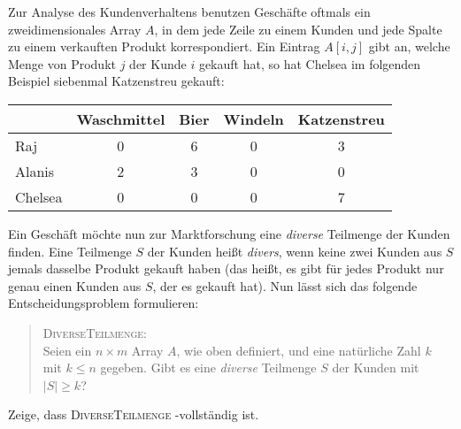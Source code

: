 \documentclass{uebung_cs}
\begin{document}
\begin{exercise}[Kundenanalyse][\hard]
	Zur Analyse des Kundenverhaltens benutzen Geschäfte oftmals ein zweidimensionales Array $A$, in dem jede Zeile zu einem Kunden und jede Spalte zu einem verkauften Produkt korrespondiert. Ein Eintrag $A[i,j]$ gibt an, welche Menge von Produkt $j$ der Kunde $i$ gekauft hat, so hat Chelsea im folgenden Beispiel siebenmal Katzenstreu gekauft:

	\begin{center}
		\begin{tabular}{l c c c c}
			\hline
			        & Waschmittel & Bier & Windeln & Katzenstreu \\
			\hline
			Raj     & 0           & 6    & 0       & 3           \\
			Alanis  & 2           & 3    & 0       & 0           \\
			Chelsea & 0           & 0    & 0       & 7           \\
			\hline
		\end{tabular}
	\end{center}

	Ein Geschäft möchte nun zur Marktforschung eine \textit{diverse} Teilmenge der Kunden finden. Eine Teilmenge $S$ der Kunden heißt \textit{divers}, wenn keine zwei Kunden aus $S$ jemals dasselbe Produkt gekauft haben (das heißt, es gibt für jedes Produkt nur genau einen Kunden aus $S$, der es gekauft hat). Nun lässt sich das folgende Entscheidungsproblem formulieren:
	\begin{quote}
		\textsc{DiverseTeilmenge}:\\
		Seien ein $n \times m$ Array $A$, wie oben definiert, und eine natürliche Zahl $k$ mit $k \leq n$ gegeben. Gibt es eine \textit{diverse} Teilmenge $S$ der Kunden mit $|S| \geq k$?
	\end{quote}
	Zeige, dass \textsc{DiverseTeilmenge} \NP-vollständig ist.
\end{exercise}

\end{document}
